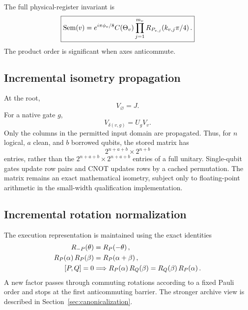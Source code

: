 The full physical-register invariant is
\begin{equation}
\boxed{
\operatorname{Sem}(v)=e^{i\pi\phi_v/8}
C(\Theta_v)
\prod_{j=1}^{m_v}
R_{P_{v,j}}\!\left(k_{v,j}\pi/4\right).
}
\label{eq:semantic-invariant}
\end{equation}
The product order is significant when axes anticommute.

\subsection{Incremental isometry propagation}

At the root,
\begin{equation}
V_\varnothing=J.
\end{equation}
For a native gate $g$,
\begin{equation}
V_{\delta(v,g)}=U_gV_v.
\label{eq:isometry-update}
\end{equation}
Only the columns in the permitted input domain are propagated. Thus, for $n$ logical, $a$ clean, and $b$ borrowed qubits, the stored matrix has
\begin{equation}
2^{n+a+b}\times 2^{n+b}
\end{equation}
entries, rather than the $2^{n+a+b}\times2^{n+a+b}$ entries of a full unitary. Single-qubit gates update row pairs and CNOT updates rows by a cached permutation. The matrix remains an exact mathematical isometry, subject only to floating-point arithmetic in the small-width qualification implementation.

\subsection{Incremental rotation normalization}

The execution representation is maintained using the exact identities
\begin{align}
\RPauli{-P}{\theta}&=\RPauli{P}{-\theta},
\label{eq:sign-normalization}\\
\RPauli{P}{\alpha}\RPauli{P}{\beta}
&=\RPauli{P}{\alpha+\beta},
\label{eq:same-axis-fusion}\\
[P,Q]=0
&\Longrightarrow
\RPauli{P}{\alpha}\RPauli{Q}{\beta}
=\RPauli{Q}{\beta}\RPauli{P}{\alpha}.
\label{eq:commuting-swap}
\end{align}
A new factor passes through commuting rotations according to a fixed Pauli order and stops at the first anticommuting barrier. The stronger archive view is described in Section~\ref{sec:canonicalization}.

